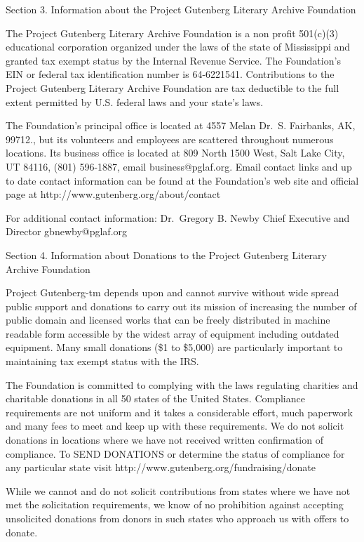 \documentclass[12pt,oneside]{scrbook}
\begin{document}
  Section 3. Information about the Project Gutenberg Literary Archive
  Foundation
  
  The Project Gutenberg Literary Archive Foundation is a non profit
  501(c)(3) educational corporation organized under the laws of the state
  of Mississippi and granted tax exempt status by the Internal Revenue
  Service. The Foundation's EIN or federal tax identification number is
  64-6221541. Contributions to the Project Gutenberg Literary Archive
  Foundation are tax deductible to the full extent permitted by U.S.
  federal laws and your state's laws.
  
  The Foundation's principal office is located at 4557 Melan Dr.~S.
  Fairbanks, AK, 99712., but its volunteers and employees are scattered
  throughout numerous locations. Its business office is located at 809
  North 1500 West, Salt Lake City, UT 84116, (801) 596-1887, email
  business@pglaf.org. Email contact links and up to date contact
  information can be found at the Foundation's web site and official page
  at http://www.gutenberg.org/about/contact
  
  For additional contact information: Dr.~Gregory B. Newby Chief Executive
  and Director gbnewby@pglaf.org
  
  Section 4. Information about Donations to the Project Gutenberg Literary
  Archive Foundation
  
  Project Gutenberg-tm depends upon and cannot survive without wide spread
  public support and donations to carry out its mission of increasing the
  number of public domain and licensed works that can be freely
  distributed in machine readable form accessible by the widest array of
  equipment including outdated equipment. Many small donations (\$1 to
  \$5,000) are particularly important to maintaining tax exempt status
  with the IRS.
  
  The Foundation is committed to complying with the laws regulating
  charities and charitable donations in all 50 states of the United
  States. Compliance requirements are not uniform and it takes a
  considerable effort, much paperwork and many fees to meet and keep up
  with these requirements. We do not solicit donations in locations where
  we have not received written confirmation of compliance. To SEND
  DONATIONS or determine the status of compliance for any particular state
  visit http://www.gutenberg.org/fundraising/donate
  
  While we cannot and do not solicit contributions from states where we
  have not met the solicitation requirements, we know of no prohibition
  against accepting unsolicited donations from donors in such states who
  approach us with offers to donate.
  
\end{document}
